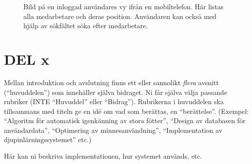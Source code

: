 \documentclass[a4paper,12pt]{article}
\begin{document}
 \begin{figure}[H]
   \centering
   \caption{Bild på en inloggad användares vy ifrån en mobiltelefon. Här listas alla medarbetare och deras position. Användaren kan också med hjälp av sökfältet söka efter medarbetare. }
   \label{fig:mob_show_position}
 \end{figure}


 \iffalse
 \section{DEL x}\label{sec:delX}
 Mellan introduktion och avslutning finns ett eller sannolikt \emph{flera} avsnitt (``huvuddelen'') som innehåller själva bidraget.  Ni får själva välja passande rubriker (INTE ``Huvuddel'' eller ``Bidrag'').  Rubrikerna i huvuddelen ska tillsammans med titeln ge en idé om vad som berättas, en ``berättelse''. (Exempel: ``Algoritm för automatisk igenkänning av stora fötter'', ``Design av databasen för användardata'', ``Optimering av minnesanvändning'', ``Implementation av djupinlärningssystemet'' etc.)

 Här kan ni beskriva implementationen, hur systemet används, etc.
\end{document}
